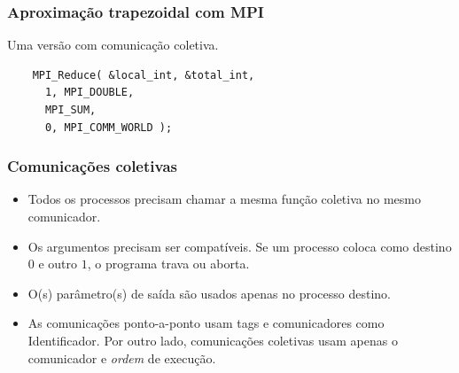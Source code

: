 \documentclass[xcolor={usenames,dvipsnames},12pt,presentation,aspectratio=169]{beamer}
\begin{document}
\begin{frame}[fragile]
  \frametitle{Aproximação trapezoidal com MPI}
  Uma versão com comunicação coletiva.
\begin{center}
\begin{minipage}{0.95\textwidth}
  \begin{verbatim}
    MPI_Reduce( &local_int, &total_int, 
      1, MPI_DOUBLE, 
      MPI_SUM, 
      0, MPI_COMM_WORLD );
  \end{verbatim}
\end{minipage}
\end{center}
\end{frame}
\begin{frame}
  \frametitle{Comunicações coletivas}
  \begin{itemize}
    \item Todos os processos precisam chamar a mesma função coletiva no mesmo comunicador.
    \item Os argumentos precisam ser compatíveis. Se um processo coloca como destino $0$ e outro $1$, o programa trava ou aborta.
    \item O(s) parâmetro(s) de saída são usados apenas no processo destino.
    \item As comunicações ponto-a-ponto usam tags e comunicadores como Identificador. Por outro lado, comunicações coletivas usam apenas o comunicador e \emph{ordem} de execução.
  \end{itemize}
\end{frame}
\end{document}
